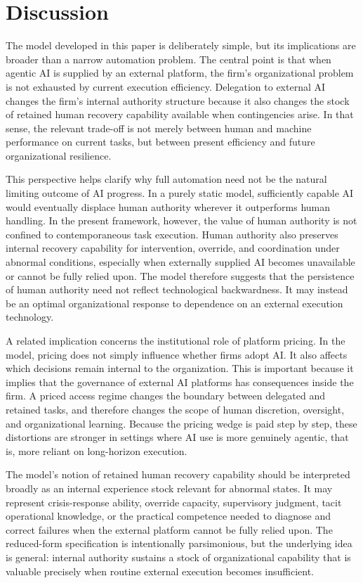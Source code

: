 \section{Discussion}
\label{sec:discussion}

The model developed in this paper is deliberately simple, but its implications are broader than a narrow automation problem. The central point is that when agentic AI is supplied by an external platform, the firm's organizational problem is not exhausted by current execution efficiency. Delegation to external AI changes the firm's internal authority structure because it also changes the stock of retained human recovery capability available when contingencies arise. In that sense, the relevant trade-off is not merely between human and machine performance on current tasks, but between present efficiency and future organizational resilience.

This perspective helps clarify why full automation need not be the natural limiting outcome of AI progress. In a purely static model, sufficiently capable AI would eventually displace human authority wherever it outperforms human handling. In the present framework, however, the value of human authority is not confined to contemporaneous task execution. Human authority also preserves internal recovery capability for intervention, override, and coordination under abnormal conditions, especially when externally supplied AI becomes unavailable or cannot be fully relied upon. The model therefore suggests that the persistence of human authority need not reflect technological backwardness. It may instead be an optimal organizational response to dependence on an external execution technology.

A related implication concerns the institutional role of platform pricing. In the model, pricing does not simply influence whether firms adopt AI. It also affects which decisions remain internal to the organization. This is important because it implies that the governance of external AI platforms has consequences inside the firm. A priced access regime changes the boundary between delegated and retained tasks, and therefore changes the scope of human discretion, oversight, and organizational learning. Because the pricing wedge is paid step by step, these distortions are stronger in settings where AI use is more genuinely agentic, that is, more reliant on long-horizon execution.

The model's notion of retained human recovery capability should be interpreted broadly as an internal experience stock relevant for abnormal states. It may represent crisis-response ability, override capacity, supervisory judgment, tacit operational knowledge, or the practical competence needed to diagnose and correct failures when the external platform cannot be fully relied upon. The reduced-form specification is intentionally parsimonious, but the underlying idea is general: internal authority sustains a stock of organizational capability that is valuable precisely when routine external execution becomes insufficient.

